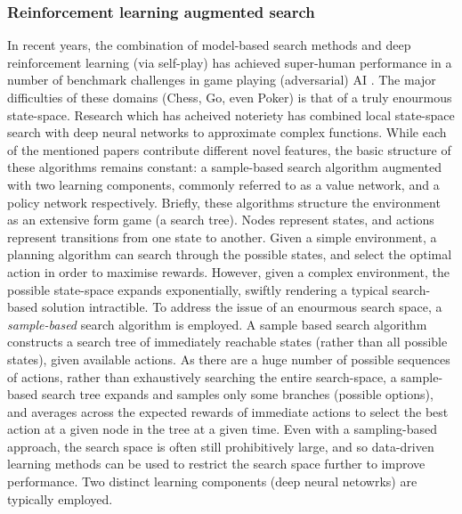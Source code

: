 \subsubsection{Reinforcement learning augmented search} \label{RL + Search}
In recent years, the combination of model-based search methods and deep reinforcement learning (via self-play) has achieved super-human performance in a number of benchmark challenges in game playing (adversarial) AI \cite{AlphaGo,Brown2020,Lerer2019}. 
The major difficulties of these domains (Chess, Go, even Poker) is that of a truly enourmous state-space. Research which has acheived noteriety has combined local state-space search with deep neural networks to approximate complex functions. 
\newline \newline
While each of the mentioned papers contribute different novel features, the basic structure of these algorithms remains constant: a sample-based search algorithm augmented with two learning components, commonly referred to as a value network, and a policy network respectively.
\newline \newline
Briefly, these algorithms structure the environment as an extensive form game (a search tree). Nodes represent states, and actions represent transitions from one state to another. Given a simple environment, a planning algorithm can search through the possible states, and select the optimal action in order to maximise rewards. However, given a complex environment, the possible state-space expands exponentially, swiftly rendering a typical search-based solution intractible. To address the issue of an enourmous search space, a \textit{sample-based} search algorithm is employed. 
\newline \newline
A sample based search algorithm constructs a search tree of immediately reachable states (rather than all possible states), given available actions. As there are a huge number of possible sequences of actions, rather than exhaustively searching the entire search-space, a sample-based search tree expands and samples only some branches (possible options), and averages across the expected rewards of immediate actions to select the best action at a given node in the tree at a given time.
\newline \newline
Even with a sampling-based approach, the search space is often still prohibitively large, and so data-driven learning methods can be used to restrict the search space further to improve performance. Two distinct learning components (deep neural netowrks) are typically employed.  
